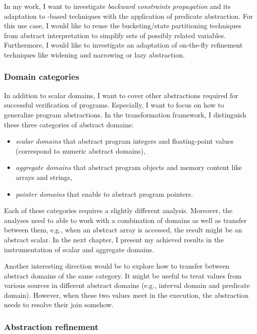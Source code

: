 In my work, I want to investigate \emph{backward constraints propagation} and
its adaptation to \cegar-based techniques with the application of predicate
abstraction. For this use case, I would like to reuse the bucketing/state
partitioning techniques from abstract interpretation to simplify sets of
possibly related variables. Furthermore, I would like to investigate an
adaptation of on-the-fly refinement techniques like widening and narrowing or
lazy abstraction.

\subsubsection{ Domain categories }

In addition to scalar domains, I want to cover other abstractions required for
successful verification of \llvm programs. Especially, I want to focus on how to
generalize program abstractions. In the transformation framework, I distinguish
these three categories of abstract domains:

\begin{itemize}
    \item \emph{scalar domains} that abstract program integers and floating-point values (correspond to numeric abstract domains),
    \item \emph{aggregate domains} that abstract program objects and memory content like arrays and strings,

    \item \emph{pointer domains} that enable to abstract program pointers.
\end{itemize}

\noindent
Each of these categories requires a slightly different analysis. Moreover,  the
analyses need to able to work with a combination of domains as well as transfer
between them, e.g., when an abstract array is accessed, the result might
be an abstract scalar.  In the next chapter, I present my achieved results in
the instrumentation of scalar and aggregate domains.

Another interesting direction would be to explore how to transfer between
abstract domains of the same category. It might be useful to treat values from
various sources in different abstract domains (e.g., interval domain and
predicate domain). However, when these two values meet in the execution, the
abstraction needs to resolve their join somehow.

\subsubsection{Abstraction refinement}


